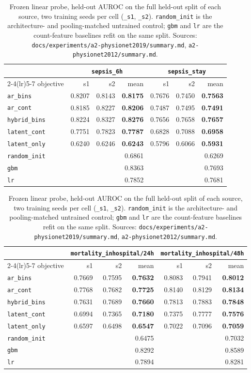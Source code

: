 \documentclass[11pt,a4paper]{article}
\newcommand{\code}[1]{\texttt{\small #1}}
\newcommand{\best}[1]{\textbf{#1}}
\begin{document}
\begin{table}[h]
\centering\small
\caption{Frozen linear probe, held-out AUROC on the full held-out split of
each source, two training seeds per cell (\code{\_s1}, \code{\_s2}).
\code{random\_init} is the architecture- and pooling-matched untrained
control; \code{gbm} and \code{lr} are the count-feature baselines refit on the
same split. Sources: \code{docs/experiments/a2-physionet2019/summary.md},
\code{a2-physionet2012/summary.md}.}
\label{tab:a2probe}
\begin{tabular}{lrrrrrr}
\toprule
& \multicolumn{3}{c}{\code{sepsis\_6h}} & \multicolumn{3}{c}{\code{sepsis\_stay}} \\
\cmidrule(lr){2-4}\cmidrule(lr){5-7}
objective & s1 & s2 & mean & s1 & s2 & mean \\
\midrule
\code{ar\_bins} & 0.8207 & 0.8143 & \best{0.8175} & 0.7676 & 0.7450 & \best{0.7563} \\
\code{ar\_cont} & 0.8185 & 0.8227 & \best{0.8206} & 0.7487 & 0.7495 & \best{0.7491} \\
\code{hybrid\_bins} & 0.8224 & 0.8327 & \best{0.8276} & 0.7656 & 0.7658 & \best{0.7657} \\
\code{latent\_cont} & 0.7751 & 0.7823 & \best{0.7787} & 0.6828 & 0.7088 & \best{0.6958} \\
\code{latent\_only} & 0.6240 & 0.6246 & \best{0.6243} & 0.5796 & 0.6066 & \best{0.5931} \\
\midrule
\code{random\_init} & & & 0.6861 & & & 0.6269 \\
\code{gbm} & & & 0.8363 & & & 0.7693 \\
\code{lr} & & & 0.7852 & & & 0.7681 \\
\bottomrule
\end{tabular}

\vspace{6pt}

\begin{tabular}{lrrrrrr}
\toprule
& \multicolumn{3}{c}{\code{mortality\_inhospital/24h}} & \multicolumn{3}{c}{\code{mortality\_inhospital/48h}} \\
\cmidrule(lr){2-4}\cmidrule(lr){5-7}
objective & s1 & s2 & mean & s1 & s2 & mean \\
\midrule
\code{ar\_bins} & 0.7669 & 0.7595 & \best{0.7632} & 0.8083 & 0.7941 & \best{0.8012} \\
\code{ar\_cont} & 0.7768 & 0.7682 & \best{0.7725} & 0.8140 & 0.8129 & \best{0.8134} \\
\code{hybrid\_bins} & 0.7631 & 0.7689 & \best{0.7660} & 0.7813 & 0.7883 & \best{0.7848} \\
\code{latent\_cont} & 0.6994 & 0.7365 & \best{0.7180} & 0.7375 & 0.7777 & \best{0.7576} \\
\code{latent\_only} & 0.6597 & 0.6498 & \best{0.6547} & 0.7022 & 0.7096 & \best{0.7059} \\
\midrule
\code{random\_init} & & & 0.6475 & & & 0.7032 \\
\code{gbm} & & & 0.8292 & & & 0.8589 \\
\code{lr} & & & 0.7894 & & & 0.8281 \\
\bottomrule
\end{tabular}
\end{table}
\end{document}
